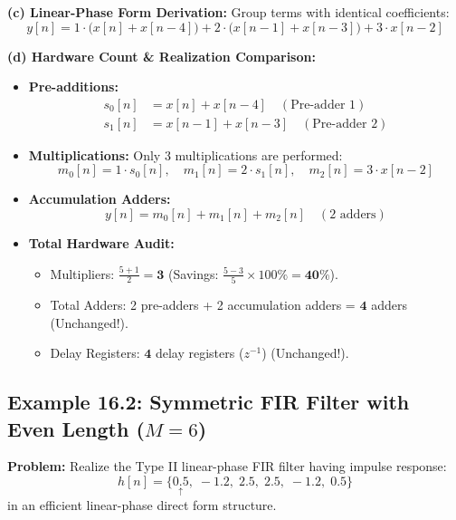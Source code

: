 \documentclass[11pt,a4paper]{article}
\begin{document}
\vspace{0.2cm}
\noindent\textbf{(c) Linear-Phase Form Derivation:}
Group terms with identical coefficients:
\begin{equation}
y[n] = 1 \cdot \Big( x[n] + x[n-4] \Big) + 2 \cdot \Big( x[n-1] + x[n-3] \Big) + 3 \cdot x[n-2]
\end{equation}

\vspace{0.2cm}
\noindent\textbf{(d) Hardware Count \& Realization Comparison:}
\begin{itemize}
    \item \textbf{Pre-additions:} 
    \begin{align*}
    s_0[n] &= x[n] + x[n-4] \quad (\text{Pre-adder 1}) \\
    s_1[n] &= x[n-1] + x[n-3] \quad (\text{Pre-adder 2})
    \end{align*}
    \item \textbf{Multiplications:}
    Only 3 multiplications are performed:
    \begin{equation}
    m_0[n] = 1 \cdot s_0[n], \quad m_1[n] = 2 \cdot s_1[n], \quad m_2[n] = 3 \cdot x[n-2]
    \end{equation}
    \item \textbf{Accumulation Adders:}
    \begin{equation}
    y[n] = m_0[n] + m_1[n] + m_2[n] \quad (\text{2 adders})
    \end{equation}
    \item \textbf{Total Hardware Audit:}
    \begin{itemize}
        \item Multipliers: $\frac{5+1}{2} = \mathbf{3}$ (Savings: $\frac{5-3}{5} \times 100\% = \mathbf{40\%}$).
        \item Total Adders: 2 pre-adders + 2 accumulation adders = $\mathbf{4}$ adders (Unchanged!).
        \item Delay Registers: $\mathbf{4}$ delay registers ($z^{-1}$) (Unchanged!).
    \end{itemize}
\end{itemize}

\vspace{0.4cm}
\subsection{\texorpdfstring{Example 16.2: Symmetric FIR Filter with Even Length ($M=6$)}{Example 16.2: Symmetric FIR Filter with Even Length (M=6)}}
\textbf{Problem:} Realize the Type II linear-phase FIR filter having impulse response:
\begin{equation}
h[n] = \{ \underset{\uparrow}{0.5}, \; -1.2, \; 2.5, \; 2.5, \; -1.2, \; 0.5 \}
\end{equation}
in an efficient linear-phase direct form structure.
\end{document}
